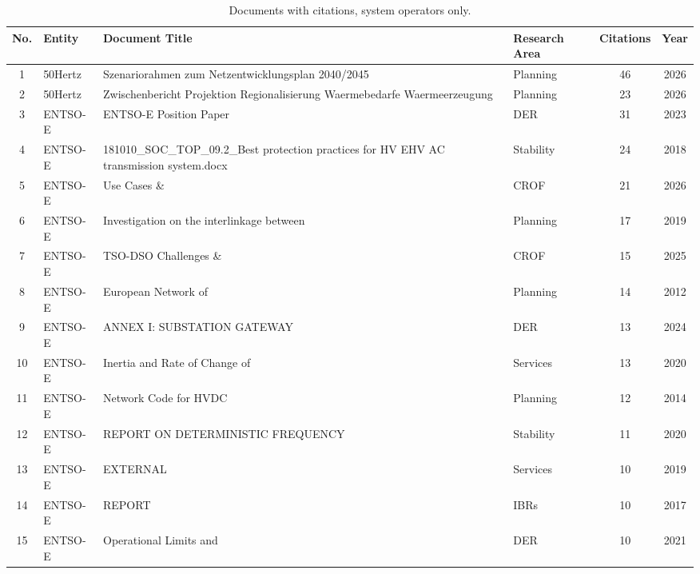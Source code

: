 %   
{\small
\renewcommand{\arraystretch}{1.0}
\begin{longtable}{c l p{5.5cm} l c c}
\caption{Documents with citations, system operators only.}
\label{tab:documents_with_citations_system_operators}\\
\toprule
No. & Entity & Document Title & Research Area & Citations & Year \\
\midrule
\endhead
1 & 50Hertz & Szenariorahmen zum Netzentwicklungsplan 2040/2045 & Planning & 46 & 2026 \\
2 & 50Hertz & Zwischenbericht Projektion Regionalisierung Waermebedarfe Waermeerzeugung & Planning & 23 & 2026 \\
3 & ENTSO-E & ENTSO-E Position Paper & DER & 31 & 2023 \\
4 & ENTSO-E & 181010\_SOC\_TOP\_09.2\_Best protection practices for HV EHV AC transmission system.docx & Stability & 24 & 2018 \\
5 & ENTSO-E & Use Cases \& & CROF & 21 & 2026 \\
6 & ENTSO-E & Investigation on the interlinkage between & Planning & 17 & 2019 \\
7 & ENTSO-E & TSO-DSO Challenges \& & CROF & 15 & 2025 \\
8 & ENTSO-E & European Network of & Planning & 14 & 2012 \\
9 & ENTSO-E & ANNEX I: SUBSTATION GATEWAY & DER & 13 & 2024 \\
10 & ENTSO-E & Inertia and Rate of Change of & Services & 13 & 2020 \\
11 & ENTSO-E & Network Code for HVDC & Planning & 12 & 2014 \\
12 & ENTSO-E & REPORT ON DETERMINISTIC FREQUENCY & Stability & 11 & 2020 \\
13 & ENTSO-E & EXTERNAL & Services & 10 & 2019 \\
14 & ENTSO-E & REPORT & IBRs & 10 & 2017 \\
15 & ENTSO-E & Operational Limits and & DER & 10 & 2021 \\

\end{longtable}}
